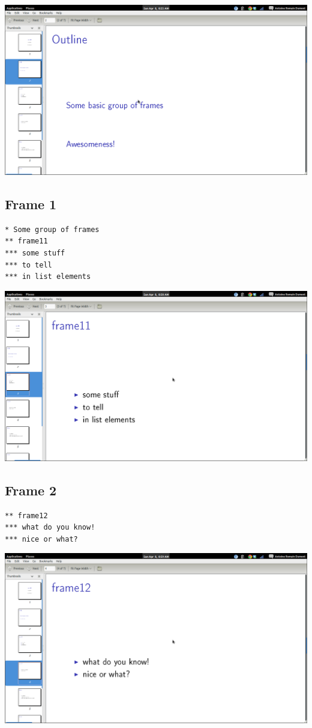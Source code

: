 \documentclass[11pt]{article}
\begin{document}
\includegraphics[width=.9\linewidth]{./org-beamer-examples/outline.png}
\subsection{Frame 1}
\label{sec-3-5}


\begin{verbatim}
* Some group of frames
** frame11
*** some stuff
*** to tell
*** in list elements
\end{verbatim}

\includegraphics[width=.9\linewidth]{./org-beamer-examples/frame-11.png}
\subsection{Frame 2}
\label{sec-3-6}


\begin{verbatim}
** frame12
*** what do you know!
*** nice or what?
\end{verbatim}

\includegraphics[width=.9\linewidth]{./org-beamer-examples/frame-12.png}
\end{document}
